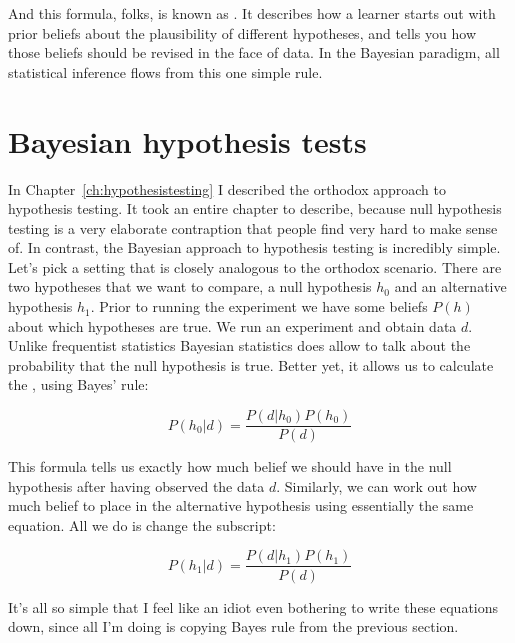 \noindent
And this formula, folks, is known as . It describes how a learner starts out with prior beliefs about the plausibility of different hypotheses, and tells you how those beliefs should be revised in the face of data. In the Bayesian paradigm, all statistical inference flows from this one simple rule.

\section{Bayesian hypothesis tests~\label{sec:bayesianhypothesistests}}

In Chapter~\ref{ch:hypothesistesting} I described the orthodox approach to hypothesis testing. It took an entire chapter to describe, because null hypothesis testing is a very elaborate contraption that people find very hard to make sense of. In contrast, the Bayesian approach to hypothesis testing is incredibly simple. Let's pick a setting that is closely analogous to the orthodox scenario. There are two hypotheses that we want to compare, a null hypothesis $h_0$ and an alternative hypothesis $h_1$. Prior to running the experiment we have some beliefs $P(h)$ about which hypotheses are true. We run an experiment and obtain data $d$. Unlike frequentist statistics Bayesian statistics does allow to talk about the probability that the null hypothesis is true. Better yet, it allows us to calculate the , using Bayes' rule:

$$
P(h_0 | d) = \frac{P(d|h_0) P(h_0)}{P(d)}
$$

\noindent
This formula tells us exactly how much belief we should have in the null hypothesis after having observed the data $d$. Similarly, we can work out how much belief to place in the alternative hypothesis using essentially the same equation. All we do is change the subscript:

$$
P(h_1 | d) = \frac{P(d|h_1) P(h_1)}{P(d)}
$$

\noindent
It's all so simple that I feel like an idiot even bothering to write these equations down, since all I'm doing is copying Bayes rule from the previous section.



